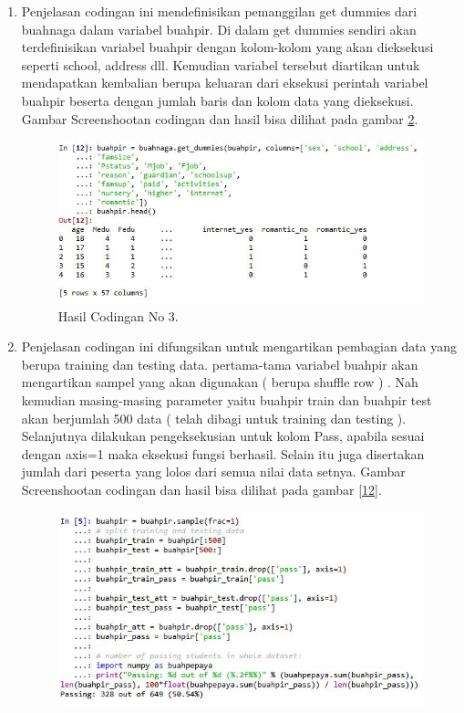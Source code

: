 \begin{enumerate}
\begin{figure}[!htbp]
		\caption{Hasil Codingan No 2.}
		\label{10}
\end{figure}
\item Penjelasan codingan ini mendefinisikan pemanggilan get dummies dari buahnaga dalam variabel buahpir. Di dalam get dummies sendiri akan terdefinisikan variabel buahpir dengan kolom-kolom yang akan dieksekusi seperti school, address dll. Kemudian variabel tersebut diartikan untuk mendapatkan kembalian berupa keluaran dari eksekusi perintah variabel buahpir beserta dengan jumlah baris dan kolom data yang dieksekusi.
\subitem Gambar Screenshootan codingan dan hasil bisa dilihat pada gambar \ref{11}.
\begin{figure}[!htbp]
		\centerline{\includegraphics[width=1\textwidth]{figures/huda/3_hari4.JPG}}
		\caption{Hasil Codingan No 3.}
		\label{11}
\end{figure}
\item Penjelasan codingan ini difungsikan untuk mengartikan pembagian data yang berupa training dan testing data. pertama-tama variabel buahpir akan mengartikan sampel yang akan digunakan ( berupa shuffle row ) . Nah kemudian masing-masing parameter yaitu buahpir train dan buahpir test akan berjumlah 500 data ( telah dibagi untuk training dan testing ). Selanjutnya dilakukan pengeksekusian untuk kolom Pass, apabila sesuai dengan axis=1 maka eksekusi fungsi berhasil. Selain itu juga disertakan jumlah dari peserta yang lolos dari semua nilai data setnya.  
\subitem Gambar Screenshootan codingan dan hasil bisa dilihat pada gambar \ref{12}.
\begin{figure}[!htbp]
		\centerline{\includegraphics[width=1\textwidth]{figures/huda/4_hari4.JPG}}

\end{figure}
\end{enumerate}
